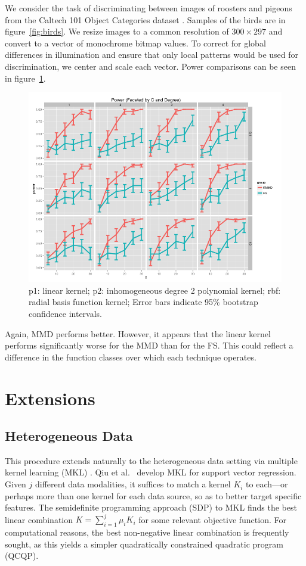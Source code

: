 We consider the task of discriminating between images of roosters and
pigeons from the Caltech 101 Object Categories dataset
\cite{fei2007learning}.  Samples of the birds are in figure~\ref{fig:birds}.
We resize images to a common resolution of $300 \times
297$ and convert to a vector of monochrome bitmap values.  
To correct for global differences in illumination and ensure
that only local patterns would be used for discrimination, we center and
scale each vector.  Power comparisons can be seen in figure~\ref{fig:power_birds}.

\begin{figure}
  \centering
  \includegraphics[width=\linewidth]{power_birds.png}
  \caption{p1: linear kernel; p2: inhomogeneous degree 2 polynomial
    kernel; rbf: radial basis function kernel; Error bars indicate
    95\% bootstrap confidence intervals.}
  \label{fig:power_birds}
\end{figure}

Again, MMD performs better.  However, it appears that the linear
kernel performs significantly worse for the MMD than for the FS.
This could reflect a difference in the function classes over which
each technique operates.  

\section{Extensions}
\subsection{Heterogeneous Data}
This procedure extends naturally to the heterogeneous data setting via
multiple kernel learning (MKL) \cite{lanckriet2004learning,
  gonen2011multiple}.  Qiu et al.\ \cite{qiu2005multiple} develop MKL
for support vector regression.  Given $j$ different data modalities,
it suffices to match a kernel $K_i$ to each---or perhaps more than one
kernel for each data source, so as to better target specific features.
The semidefinite programming approach (SDP) to MKL finds the best
linear combination $K = \sum_{i=1}^j \mu_i K_i$ for some relevant
objective function.  For computational reasons, the best non-negative
linear combination is frequently sought, as this yields a simpler quadratically
constrained quadratic program (QCQP).

